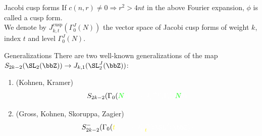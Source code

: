 \documentclass[mathserif,12pt]{beamer}
\begin{document}
\begin{frame}{Jacobi cusp forms}
If $c(n, r) \neq 0 \Rightarrow r^2 > 4nt$ in the above Fourier expansion, $\phi$ is called a cusp form.\\[0.5in]
\pause
We denote by $J_{k, t}^{\text{cusp}}(\Gamma_0^J(N))$ the vector space of Jacobi cusp forms of weight $k$, index $t$ and level $\Gamma_0^J(N)$.

\end{frame}

\begin{frame}{Generalizations}
There are two well-known generalizations of the map $S_{2k-2}(\SL_2(\bbZ)) \rightarrow J_{k,1}(\SL_2^J(\bbZ))$: \pause

\begin{enumerate}
\item (Kohnen, Kramer)
\begin{equation*}
S_{2k - 2}(\Gamma_0(\color{green}N\color{white})) \longrightarrow J_{k,1}^{\text{cusp}}(\Gamma_0^{J}(\color{green}N\color{white}))
\end{equation*} \pause
\item (Gross, Kohnen, Skoruppa, Zagier)
\begin{equation*}
S_{2k - 2}^{-}(\Gamma_0(\color{yellow}t\color{white})) \longrightarrow J^{\text{cusp}}_{k, \color{yellow}t\color{white}}(\SL_2^{J}(\bbZ))
\end{equation*}
\end{enumerate}

\end{frame}
\end{document}
